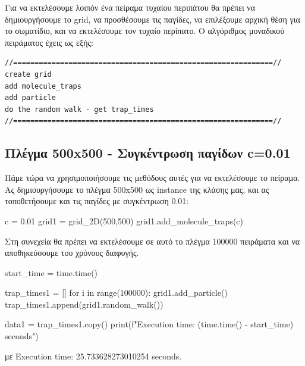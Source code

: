 \gr 
Για να εκτελέσουμε λοιπόν ένα πείραμα τυχαίου περιπάτου θα πρέπει να δημιουργήσουμε το {\en grid}, να προσθέσουμε τις παγίδες, να επιλέξουμε αρχική θέση για το σωματίδιο, και να εκτελέσουμε τον τυχαίο περίπατο. Ο αλγόριθμος μοναδικού πειράματος έχεις ως εξής:
\en
\begin{lstlisting}
//=============================================================//
create grid
add molecule_traps
add particle
do the random walk - get trap_times
//=============================================================//
\end{lstlisting}
\gr 
\subsection{Πλέγμα 500{\en x}500 - Συγκέντρωση παγίδων {\en c}=0.01}
Πάμε τώρα να χρησιμοποιήσουμε τις μεθόδους αυτές για να εκτελέσουμε το πείραμα. Ας δημιουργήσουμε το πλέγμα 500{\en x}500 ως {\en instance} της κλάσης μας, και ας τοποθετήσουμε και τις παγίδες με συγκέντρωση 0.01:
\en 
\begin{python}
c = 0.01
grid1 = grid_2D(500,500)
grid1.add_molecule_traps(c)
\end{python}
\gr 
Στη συνεχεία θα πρέπει να εκτελέσουμε σε αυτό το πλέγμα 100000 πειράματα και να αποθηκεύσουμε του χρόνους διαφυγής.
\en
\begin{python}
start_time = time.time()

trap_times1 = []
for i in range(100000):
    grid1.add_particle()
    trap_times1.append(grid1.random_walk())

data1 = trap_times1.copy()
print(f"Execution time: {(time.time() - start_time)} seconds")
\end{python}
\gr 
με {\en Execution time: 25.733628273010254 seconds}. 

